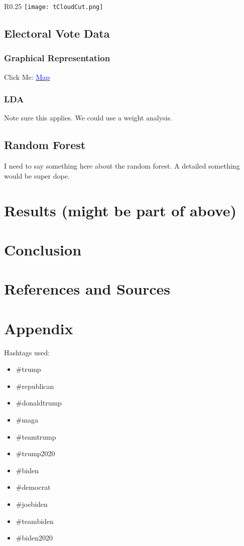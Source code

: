 \documentclass[11pt, oneside]{article}
\begin{document}
\begin{wrapfigure}[]{R}{0.25\textwidth}
\vspace{-0.55cm}
\texttt{[image: tCloudCut.png]}
\vspace{-.55cm}
\end{wrapfigure}



\subsection{Electoral Vote Data}

\subsubsection{Graphical Representation}
Click Me: \href{https://public.tableau.com/profile/kursten.reznik#!/vizhome/Twitter_Project_16041047339100/DemographicDashboard}{\textcolor{blue}{Map}}\\



\subsubsection{LDA}
Note sure this applies. We could use a weight analysis. 


\subsection{Random Forest}
I need to say something here about the random forest. A detailed something would be super dope.


\section{Results (might be part of above)}





\section{Conclusion}



\pagebreak
\section{References and Sources}


\pagebreak
\section{Appendix}
Hashtags used:
\begin{itemize}
	\item \#trump
    \item \#republican
    \item \#donaldtrump
    \item \#maga
    \item \#teamtrump
    \item \#trump2020 
    \item \#biden
    \item \#democrat
    \item \#joebiden
    \item \#teambiden
    \item \#biden2020
\end{itemize}
\end{document}
